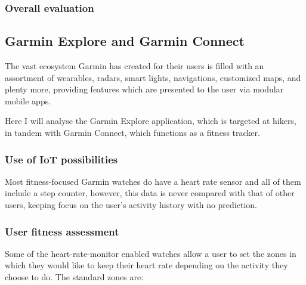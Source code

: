 \subsubsection*{Overall evaluation}

\subsection{Garmin Explore and Garmin Connect}
The vast ecosystem Garmin has created for their users is filled with an assortment of wearables, radars, smart lights, navigations, customized maps, and plenty more, providing features which are presented to the user via modular mobile apps.

Here I will analyse the Garmin Explore application, which is targeted at hikers, in tandem with Garmin Connect, which functions as a fitness tracker.

\subsubsection*{Use of IoT possibilities}
Most fitness-focused Garmin watches do have a heart rate sensor and all of them include a step counter, however, this data is never compared with that of other users, keeping focus on the user's activity history with no prediction.
\subsubsection*{User fitness assessment}
Some of the heart-rate-monitor enabled watches allow a user to set the zones in which they would like to keep their heart rate depending on the activity they choose to do. The standard zones are:


